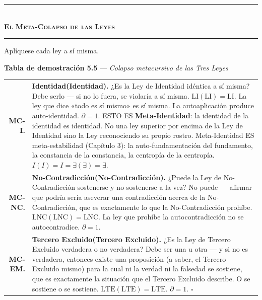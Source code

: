 \documentclass[10pt, openany, oneside]{book}
\renewcommand{\normalsize}{\fontsize{10}{13}\selectfont}
\renewcommand{\footnotesize}{\fontsize{8.5}{11}\selectfont}
\begin{document}

\begin{center}
    \rule{0.3\textwidth}{0.4pt}\\[0.5em]
    {\normalsize\bfseries\scshape El Meta-Colapso de las Leyes}\\[0.3em]
    \rule{0.3\textwidth}{0.4pt}
\end{center}

\vspace{1em}

\noindent Aplíquese cada ley a sí misma.

\textbf{Tabla de demostración 5.5} --- \textit{Colapso metacursivo de las Tres Leyes}

\vspace{0.5em}

{\footnotesize
\noindent\begin{tabular}{r p{}}
\textbf{MC-I.} & \textbf{Identidad(Identidad).} ¿Es la Ley de Identidad idéntica a sí misma? Debe serlo --- si no lo fuera, se violaría a sí misma. $\text{LI}(\text{LI}) = \text{LI}$. La ley que dice «todo es sí mismo» es sí misma. La autoaplicación produce auto-identidad. $\partial = 1$. ESTO ES \textbf{Meta-Identidad}: la identidad de la identidad es identidad. No una ley superior por encima de la Ley de Identidad sino la Ley reconociendo su propio rostro. Meta-Identidad ES meta-estabilidad (Capítulo 3): la auto-fundamentación del fundamento, la constancia de la constancia, la centropía de la centropía. $I(I) = I = \exists(\exists) = \exists$. \\[0.3em]
\textbf{MC-NC.} & \textbf{No-Contradicción(No-Contradicción).} ¿Puede la Ley de No-Contradicción sostenerse y no sostenerse a la vez? No puede --- afirmar que podría sería aseverar una contradicción acerca de la No-Contradicción, que es exactamente lo que la No-Contradicción prohíbe. $\text{LNC}(\text{LNC}) = \text{LNC}$. La ley que prohíbe la autocontradicción no se autocontradice. $\partial = 1$. \\[0.3em]
\textbf{MC-EM.} & \textbf{Tercero Excluido(Tercero Excluido).} ¿Es la Ley de Tercero Excluido verdadera o no verdadera? Debe ser una u otra --- y si no es verdadera, entonces existe una proposición (a saber, el Tercero Excluido mismo) para la cual ni la verdad ni la falsedad se sostiene, que es exactamente la situación que el Tercero Excluido describe. O se sostiene o se sostiene. $\text{LTE}(\text{LTE}) = \text{LTE}$. $\partial = 1$. $\square$ \\[0.3em]
\end{tabular}
}
\end{document}
